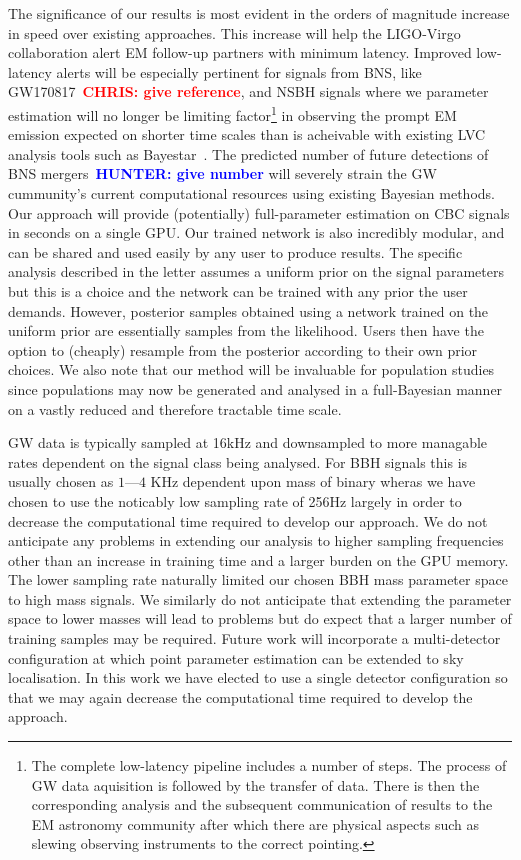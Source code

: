 \documentclass[%
showpacs,
 amsmath,amssymb,
 aps,
 twocolumn,
 prl,
 reprint,
floatfix,
]{revtex4-1}
\newcommand{\chris}[1]{\textbf{\textcolor{red}{CHRIS: #1}}}
\newcommand{\hunter}[1]{\textbf{\textcolor{blue}{HUNTER: #1}}}
\begin{document}
%
%
The significance of our results is most evident in the orders of magnitude
increase in speed over existing approaches. This increase will help the
LIGO-Virgo collaboration alert \ac{EM} follow-up partners with minimum latency.
Improved low-latency alerts will be especially pertinent for signals from
\ac{BNS}, like GW170817~\chris{give reference}, and \ac{NSBH} signals where we
parameter estimation will no longer be limiting factor\footnote{The complete
low-latency pipeline includes a number of steps. The process of \ac{GW} data
aquisition is followed by the transfer of data. There is then the corresponding
analysis and the subsequent communication of results to the \ac{EM} astronomy
community after which there are physical aspects such as slewing observing
instruments to the correct pointing.} in observing the prompt \ac{EM} emission
expected on shorter time scales than is acheivable with existing \ac{LVC}
analysis tools such as Bayestar~\cite{2016PhRvD..93b4013S}. The predicted number of
future detections of \ac{BNS} mergers~\hunter{ give number} will severely
strain the \ac{GW} cummunity's current computational resources using existing
Bayesian methods. Our approach will provide (potentially) full-parameter
estimation on \ac{CBC} signals in seconds on a single \ac{GPU}. Our trained
network is also incredibly modular, and can be shared and used easily by any
user to produce results. The specific analysis described in the letter assumes
a uniform prior on the signal parameters but this is a choice and the network
can be trained with any prior the user demands. However, posterior samples
obtained using a network trained on the uniform prior are essentially samples
from the likelihood. Users then have the option to (cheaply) resample from the
posterior according to their own prior choices. We also note that our method
will be invaluable for population studies since populations may now be
generated and analysed in a full-Bayesian manner on a vastly reduced and
therefore tractable time scale. 

%
%
\ac{GW} data is typically sampled at 16kHz and downsampled to more managable
rates dependent on the signal class being analysed. For \ac{BBH} signals this
is usually chosen as $1$---$4$ KHz dependent upon mass of binary wheras we have
chosen to use the noticably low sampling rate of 256Hz largely in order to
decrease the computational time required to develop our approach. We do not
anticipate any problems in extending our analysis to higher sampling
frequencies other than an increase in training time and a larger burden on the
\ac{GPU} memory. The lower sampling rate naturally limited our chosen \ac{BBH}
mass parameter space to high mass signals. We similarly do not anticipate that
extending the parameter space to lower masses will lead to problems but do
expect that a larger number of training samples may be required. Future work
will incorporate a multi-detector configuration at which point parameter
estimation can be extended to sky localisation. In this work we have elected to
use a single detector configuration so that we may again decrease the
computational time required to develop the approach.
\end{document}
